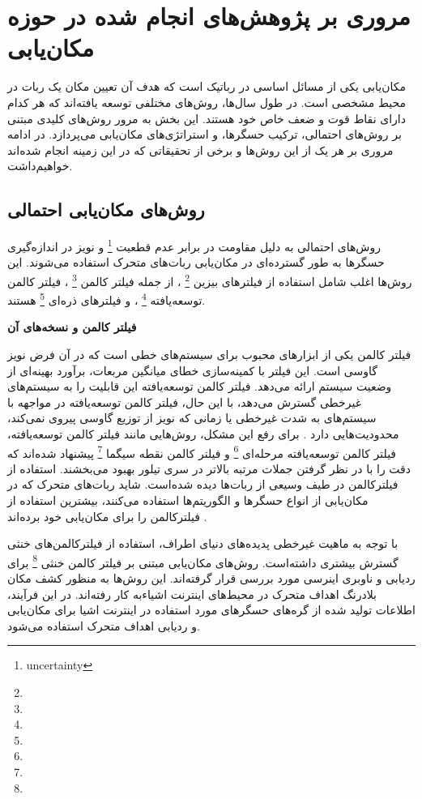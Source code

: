 \section{مروری بر پژوهش‌های انجام شده در حوزه مکان‌یابی} 

مکان‌یابی یکی از مسائل اساسی در رباتیک است که هدف آن تعیین مکان یک ربات در محیط مشخصی است. در طول سال‌ها، روش‌های مختلفی توسعه یافته‌اند که هر کدام دارای نقاط قوت و ضعف خاص خود هستند. این بخش به مرور روش‌های کلیدی مبتنی بر روش‌های احتمالی، ترکیب حسگرها، و استراتژی‌های مکان‌یابی می‌پردازد. در ادامه مروری بر هر یک از این روش‌ها و برخی از تحقیقاتی که در این زمینه انجام شده‌اند خواهیم‌داشت.


\subsection{روش‌های مکان‌یابی احتمالی}

روش‌های احتمالی به دلیل مقاومت در برابر عدم قطعیت
\footnote{uncertainty}
 و نویز در اندازه‌گیری حسگرها به طور گسترده‌ای در مکان‌یابی ربات‌های متحرک استفاده می‌شوند. این روش‌ها اغلب شامل استفاده از فیلترهای بیزین
\footnote{}
 ، از جمله فیلتر کالمن
\footnote{}
، فیلتر کالمن توسعه‌یافته
\footnote{}
، و فیلترهای ذره‌ای
\footnote{}
 هستند.


\textbf {فیلتر کالمن و نسخه‌های آن}

فیلتر کالمن یکی از ابزارهای محبوب برای سیستم‌های خطی است که در آن فرض نویز گاوسی است. این فیلتر با کمینه‌سازی خطای میانگین مربعات، برآورد بهینه‌ای از وضعیت سیستم ارائه می‌دهد. فیلتر کالمن توسعه‌یافته این قابلیت را به سیستم‌های غیرخطی گسترش می‌دهد، با این حال،  فیلتر کالمن توسعه‌یافته در مواجهه با سیستم‌های به شدت غیرخطی یا زمانی که نویز از توزیع گاوسی پیروی نمی‌کند، محدودیت‌هایی دارد
\cite{burgard1997active}
. برای رفع این مشکل، روش‌هایی مانند فیلتر کالمن توسعه‌یافته، فیلتر کالمن توسعه‌یافته مرحله‌ای
\footnote{}
 و فیلتر کالمن نقطه سیگما
 \footnote{}
  پیشنهاد شده‌اند که دقت را با در نظر گرفتن جملات مرتبه بالاتر در سری تیلور بهبود می‌بخشند.
استفاده از فیلترکالمن در طیف وسیعی از ربات‌ها دیده‌ شده‌است. شاید ربات‌های متحرک که در مکان‌یابی از انواع حسگر‌ها و الگوریتم‌ها استفاده می‌کنند، بیشترین‌ استفاد‌ه از فیلترکالمن را برای مکان‌یابی خود برده‌اند
\cite{liu2021cost, lin2018topological, negenborn2003robot}. 

با توجه به ماهیت غیرخطی پدیده‌های دنیای اطراف، استفاده از فیلترکالمن‌های خنثی گسترش بیشتری داشته‌است. 
\cite{zhan2007iterated, xian2016square} 
 روش‌های مکان‌یابی مبتنی بر فیلتر کالمن خنثی
\footnote{}
 برای ردیابی و ناوبری اینرسی مورد بررسی قرار گرفته‌اند. این روش‌ها به منظور کشف مکان بلادرنگ اهداف متحرک در محیط‌های اینترنت اشیاءبه کار رفته‌اند. در این فرآیند، اطلاعات تولید شده از گره‌های حسگرهای مورد استفاده در اینترنت اشیا برای مکان‌یابی و ردیابی اهداف متحرک استفاده می‌شود.
  
